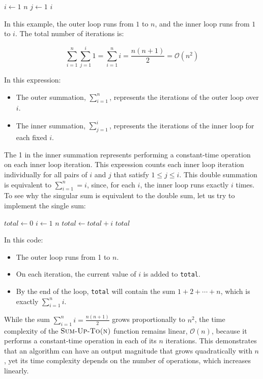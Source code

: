 \begin{example}

    \begin{codebox}
        \li \For $i \gets 1$ \To $n$ \Do
        \li     \For $j \gets 1$ \To $i$ \Do
        \li         {}
                \End
            \End
    \end{codebox}

In this example, the outer loop runs from $1$ to $n$, and the inner loop runs from $1$ to $i$. The total number of iterations is:

    \[
        \sum_{i=1}^n \sum_{j=1}^i 1 = \sum_{i=1}^{n} i = \frac{n(n + 1)}{2} = \mathcal{O}(n^2)
    \]

In this expression:
\begin{itemize}
    \item The outer summation, $\sum_{i=1}^n$, represents the iterations of the outer loop over $i$.
    \item The inner summation, $\sum_{j=1}^i$, represents the iterations of the inner loop for each fixed $i$.
\end{itemize}

The 1 in the inner summation represents performing a constant-time operation on each inner loop iteration. This expression counts each inner loop iteration individually for all pairs of $i$ and $j$ that satisfy $1 \leq j \leq i$. This double summation is equivalent to $\sum_{i=1}^n = i$, since, for each $i$, the inner loop runs exactly $i$ times. To see why the singular sum is equivalent to the double sum, let us try to implement the single sum:

\begin{codebox}
    \li $total \gets 0$
    \li \For $i \gets 1$ \To $n$ \Do
    \li     $total \gets total + i$
        \End
    \li \Return $total$
\end{codebox}

In this code:

\begin{itemize}
    \item The outer loop runs from 1 to $n$.
    \item On each iteration, the current value of $i$ is added to \texttt{total}.
    \item By the end of the loop, \texttt{total} will contain the sum $1+2+\cdots+n$, which is exactly $\sum_{i=1}^n i$.
\end{itemize}

While the sum \( \sum_{i=1}^n i = \frac{n(n + 1)}{2} \) grows proportionally to \( n^2 \), the time complexity of the $\proc{Sum-Up-To(n)}$ function remains linear, \( \mathcal{O}(n) \), because it performs a constant-time operation in each of its \( n \) iterations. This demonstrates that an algorithm can have an output magnitude that grows quadratically with \( n \), yet its time complexity depends on the number of operations, which increases linearly.

\end{example}

